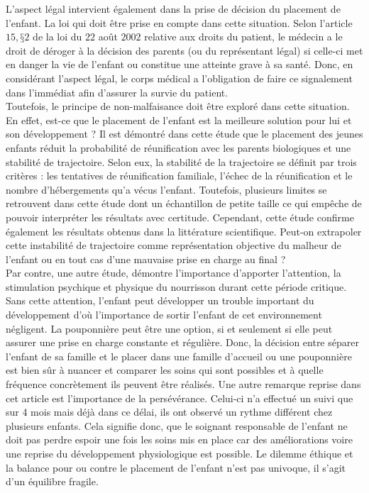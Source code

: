 L’aspect légal intervient également dans la prise de décision du placement de l’enfant. La loi qui doit être prise en compte dans cette situation. Selon l'article $15, § 2$ de la loi du $22$ août $2002$ relative aux droits du patient, le médecin a le droit de déroger à la décision des parents (ou du représentant légal) si celle-ci met en danger la vie de l'enfant ou constitue une atteinte grave à sa santé. Donc, en considérant l’aspect légal, le corps médical a l’obligation de faire ce signalement dans l’immédiat afin d’assurer la survie du patient.\\ 

Toutefois, le principe de non-malfaisance doit être exploré dans cette situation. En effet, est-ce que le placement de l’enfant est la meilleure solution pour lui et son développement ? Il est démontré dans cette étude \textcite{poitras2017contacts} que le placement des jeunes enfants réduit la probabilité de réunification avec les parents biologiques et une stabilité de trajectoire. Selon eux, la stabilité de la trajectoire se définit par trois critères : les tentatives de réunification familiale, l’échec de la réunification et le nombre d’hébergements qu’a vécus l’enfant. Toutefois, plusieurs limites se retrouvent dans cette étude dont un échantillon de petite taille ce qui empêche de pouvoir interpréter les résultats avec certitude. Cependant, cette étude confirme également les résultats obtenus dans la littérature scientifique. Peut-on extrapoler cette instabilité de trajectoire comme représentation objective du malheur de l’enfant ou en tout cas d’une mauvaise prise en charge au final ?\\

Par contre, une autre étude, \textcite{mascaro2012evaluation} démontre l’importance d’apporter l’attention, la stimulation psychique et physique du nourrisson durant cette période critique. Sans cette attention, l’enfant peut développer un trouble important du développement d’où l’importance de sortir l’enfant de cet environnement négligent. La pouponnière peut être une option, si et seulement si elle peut assurer une prise en charge constante et régulière. Donc, la décision entre séparer l’enfant de sa famille et le placer dans une famille d’accueil ou une pouponnière est bien sûr à nuancer et comparer les soins qui sont possibles et à quelle fréquence concrètement ils peuvent être réalisés. Une autre remarque reprise dans cet article est l’importance de la persévérance. Celui-ci n’a effectué un suivi que sur 4 mois mais déjà dans ce délai, ils ont observé un rythme différent chez plusieurs enfants. Cela signifie donc, que le soignant responsable de l’enfant ne doit pas perdre espoir une fois les soins mis en place car des améliorations voire une reprise du développement physiologique est possible. Le dilemme éthique et la balance pour ou contre le placement de l’enfant n’est pas univoque, il s’agit d’un équilibre fragile.\\ 

